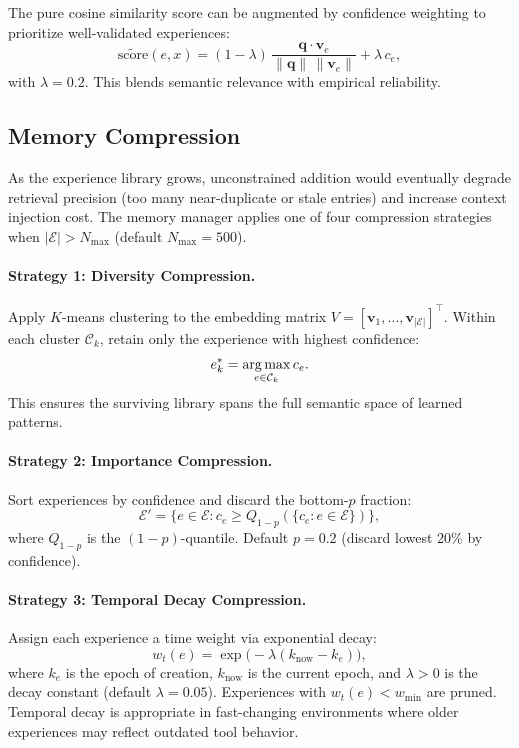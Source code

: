 The pure cosine similarity score can be augmented by confidence weighting to
prioritize well-validated experiences:
\begin{equation}
    \tilde{\text{score}}(e, x) = (1 - \lambda)\,\frac{\bm{q} \cdot \bm{v}_e}{\|\bm{q}\|\,\|\bm{v}_e\|}
    + \lambda\, c_e,
    \label{eq:conf-weighted-score}
\end{equation}
with $\lambda = 0.2$. This blends semantic relevance with empirical reliability.

\subsection{Memory Compression}
\label{sec:compression}

As the experience library grows, unconstrained addition would eventually
degrade retrieval precision (too many near-duplicate or stale entries) and
increase context injection cost. The memory manager applies one of four
compression strategies when $|\mathcal{E}| > N_{\max}$ (default $N_{\max} = 500$).

\paragraph{Strategy 1: Diversity Compression.}
Apply $K$-means clustering to the embedding matrix
$V = [\bm{v}_1, \ldots, \bm{v}_{|\mathcal{E}|}]^\top$. Within each cluster
$\mathcal{C}_k$, retain only the experience with highest confidence:
\begin{equation}
    e^*_k = \operatorname*{arg\,max}_{e \in \mathcal{C}_k} c_e.
    \label{eq:diversity-compression}
\end{equation}
This ensures the surviving library spans the full semantic space of learned
patterns.

\paragraph{Strategy 2: Importance Compression.}
Sort experiences by confidence and discard the bottom-$p$ fraction:
\begin{equation}
    \mathcal{E}' = \bigl\{e \in \mathcal{E} : c_e \geq Q_{1-p}(\{c_e : e \in \mathcal{E}\})\bigr\},
    \label{eq:importance-compression}
\end{equation}
where $Q_{1-p}$ is the $(1-p)$-quantile. Default $p = 0.2$ (discard lowest
20\% by confidence).

\paragraph{Strategy 3: Temporal Decay Compression.}
Assign each experience a time weight via exponential decay:
\begin{equation}
    w_t(e) = \exp\bigl(-\lambda(k_{\text{now}} - k_e)\bigr),
    \label{eq:temporal-decay}
\end{equation}
where $k_e$ is the epoch of creation, $k_{\text{now}}$ is the current epoch,
and $\lambda > 0$ is the decay constant (default $\lambda = 0.05$). Experiences
with $w_t(e) < w_{\min}$ are pruned. Temporal decay is appropriate in
fast-changing environments where older experiences may reflect outdated tool
behavior.

